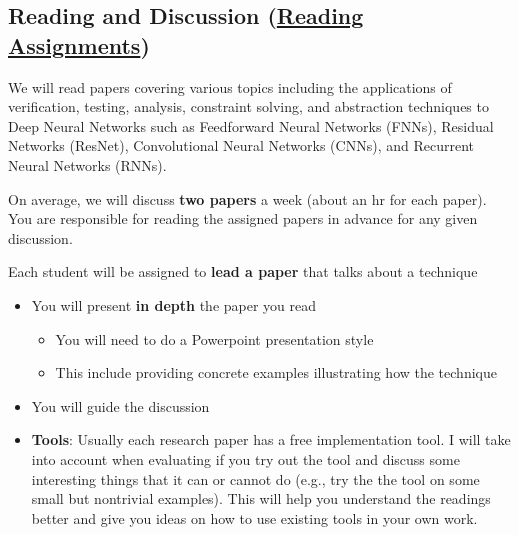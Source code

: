 \documentclass[11pt, a4paper]{article}
\begin{document}
\subsection*{Reading and Discussion (\href{https://github.com/nguyenthanhvuh/class-verification/wiki/reading}{Reading Assignments})}
\label{sec:org16c195f}

We will read papers covering various topics including the applications
of verification, testing, analysis, constraint solving, and abstraction
techniques to Deep Neural Networks such as Feedforward Neural Networks
(FNNs), Residual Networks (ResNet), Convolutional Neural Networks
(CNNs), and Recurrent Neural Networks (RNNs).

On average, we will discuss \textbf{\textbf{two  papers}} a week (about an hr for each paper). 
You are responsible for reading the assigned papers in advance for any given discussion.

Each student will be assigned to \textbf{\textbf{lead a paper}} that talks about a technique
\begin{itemize}
\item You will present \textbf{\textbf{in depth}} the paper you read
\begin{itemize}
\item You will need to do a Powerpoint presentation style
\item This include providing concrete examples illustrating how the technique
\end{itemize}
\item You will guide the discussion
\item \textbf{\textbf{Tools}}: Usually each research paper has a free implementation
tool. I will take into account when evaluating if you try out the
tool and discuss some interesting things that it can or cannot do
(e.g., try the the tool on some small but nontrivial examples). This
will help you understand the readings better and give you ideas on
how to use existing tools in your own work.
\end{itemize}
\end{document}
